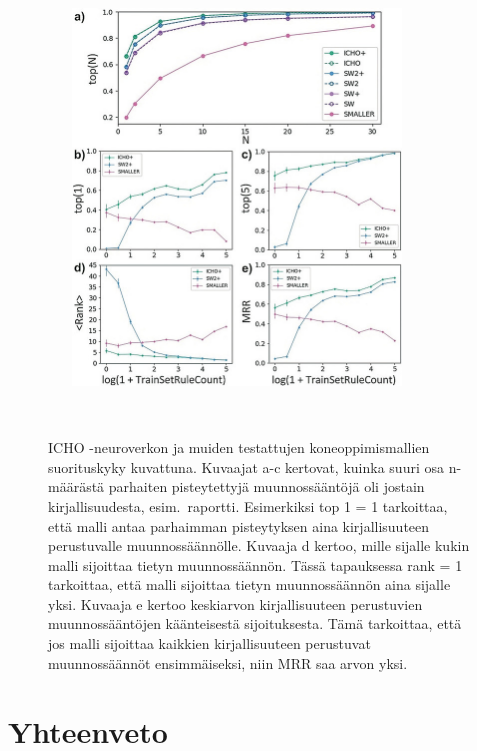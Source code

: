 \documentclass[finnish,twoside,censored,tkt,sw-line]{HYthesisML}
\begin{document}
\begin{figure}[!ht]
    \centering
    \includegraphics[width=10cm, height=10cm]{icho-performance-fig.jpg}
    \caption{
        ICHO -neuroverkon ja muiden testattujen koneoppimismallien suorituskyky kuvattuna.
        Kuvaajat a-c kertovat, kuinka suuri osa n-määrästä parhaiten pisteytettyjä muunnossääntöjä oli jostain kirjallisuudesta, esim.\ raportti.
        Esimerkiksi top 1 = 1 tarkoittaa, että malli antaa parhaimman pisteytyksen aina kirjallisuuteen perustuvalle muunnossäännölle.
        Kuvaaja d kertoo, mille sijalle kukin malli sijoittaa tietyn muunnossäännön.
        Tässä tapauksessa rank = 1 tarkoittaa, että malli sijoittaa tietyn muunnossäännön aina sijalle yksi.
        Kuvaaja e kertoo keskiarvon kirjallisuuteen perustuvien muunnossääntöjen käänteisestä sijoituksesta.
        Tämä tarkoittaa, että jos malli sijoittaa kaikkien kirjallisuuteen perustuvat muunnossäännöt ensimmäiseksi, niin MRR saa arvon yksi.
    }
    {~\cite{ExpertKnowledgeRetorsynthesis}}
    \label{fig:icho-performance}
\end{figure}

\chapter{Yhteenveto}


\end{document}
